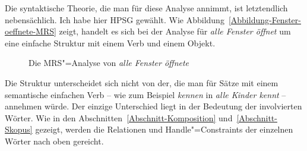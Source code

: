 Die syntaktische Theorie, die man für diese Analyse annimmt, ist letztendlich nebensächlich. Ich habe
hier HPSG gewählt. Wie Abbildung~\vref{Abbildung-Fenster-oeffnete-MRS} zeigt, handelt es sich bei der
Analyse für \emph{alle Fenster öffnet} um eine einfache Struktur mit einem Verb und einem Objekt.
\begin{figure}
\caption{\label{Abbildung-Fenster-oeffnete-MRS}Die MRS"=Analyse von \emph{alle Fenster öffnete}}
\end{figure}
Die Struktur unterscheidet sich nicht von der, die man für Sätze mit einem semantische einfachen
Verb -- wie zum Beispiel \emph{kennen} in \emph{alle Kinder kennt} -- annehmen würde. Der einzige
Unterschied liegt in der Bedeutung der involvierten Wörter.  Wie in den
Abschnitten~\ref{Abschnitt-Komposition} und~\ref{Abschnitt-Skopus} gezeigt, werden die Relationen und
Handle"=Constraints der einzelnen Wörter nach oben gereicht. 

